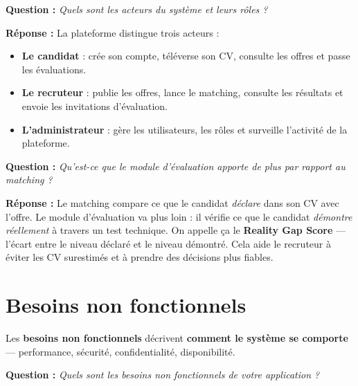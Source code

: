 \documentclass[12pt,a4paper]{article}
\newenvironment{boite}{%
  \def\FrameCommand{\fboxsep=8pt\colorbox{bleulight}}%
  \MakeFramed{\advance\hsize-\width \FrameRestore}%
  \vspace{-4pt}%
}{\endMakeFramed}
\newenvironment{jury}{%
  \def\FrameCommand{\fboxsep=8pt\colorbox{orange!12}}%
  \MakeFramed{\advance\hsize-\width \FrameRestore}%
  \vspace{-4pt}%
}{\endMakeFramed}
\newenvironment{reponse}{%
  \def\FrameCommand{\fboxsep=8pt\colorbox{green!10}}%
  \MakeFramed{\advance\hsize-\width \FrameRestore}%
  \vspace{-4pt}%
}{\endMakeFramed}
\newcommand{\concept}[1]{\textbf{\color{bleu}#1}}
\newcommand{\Q}[1]{\vspace{6pt}\noindent\textbf{\color{orange}Question :} \textit{#1}}
\newcommand{\R}[1]{\noindent\textbf{\color{vert}Réponse :} #1\vspace{6pt}}
\begin{document}
\begin{jury}
\Q{Quels sont les acteurs du système et leurs rôles ?}
\end{jury}

\begin{reponse}
\R{La plateforme distingue trois acteurs :
\begin{itemize}[leftmargin=1.5cm]
  \item \textbf{Le candidat} : crée son compte, téléverse son CV, consulte les offres et passe les évaluations.
  \item \textbf{Le recruteur} : publie les offres, lance le matching, consulte les résultats et envoie les invitations d'évaluation.
  \item \textbf{L'administrateur} : gère les utilisateurs, les rôles et surveille l'activité de la plateforme.
\end{itemize}}
\end{reponse}

\begin{jury}
\Q{Qu'est-ce que le module d'évaluation apporte de plus par rapport au matching ?}
\end{jury}

\begin{reponse}
\R{Le matching compare ce que le candidat \textit{déclare} dans son CV avec l'offre.
Le module d'évaluation va plus loin : il vérifie ce que le candidat \textit{démontre réellement} à travers un test technique.
On appelle ça le \textbf{Reality Gap Score} — l'écart entre le niveau déclaré et le niveau démontré.
Cela aide le recruteur à éviter les CV surestimés et à prendre des décisions plus fiables.}
\end{reponse}

\section{Besoins non fonctionnels}

\begin{boite}
Les \concept{besoins non fonctionnels} décrivent \textbf{comment le système se comporte} — performance, sécurité, confidentialité, disponibilité.
\end{boite}

\vspace{8pt}

\begin{jury}
\Q{Quels sont les besoins non fonctionnels de votre application ?}
\end{jury}
\end{document}
